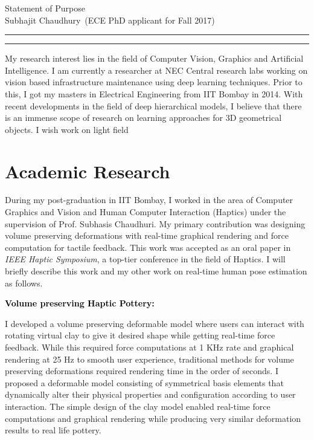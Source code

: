 \documentclass{article}
\newcommand{\soptitle}{Statement of Purpose}
\newcommand{\yourname}{Subhajit Chaudhury}
\newcommand{\statement}[1]{\par\medskip
	{\textcolor{black}{\textbf{#1:}}}\space
}
\begin{document}
	
	\begin{center}\LARGE\soptitle\\
	\large \yourname\ (ECE PhD applicant for Fall 2017)
	\end{center}
	
	\hrule
	\hrule height 1pt
	
	\bigskip
	
	My research interest lies in the field of Computer Vision, Graphics and Artificial Intelligence. I am currently a researcher at NEC Central research labs working on vision based infrastructure maintenance using deep learning techniques. Prior to this, I got my masters in Electrical Engineering from IIT Bombay in 2014. With recent developments in the field of deep hierarchical models, I believe that there is an immense scope of research on learning approaches for 3D geometrical objects. I  wish work on light field 
	
	\vspace*{-0.25cm}
	\section{Academic Research}
		\vspace*{-0.25cm}
	During my post-graduation in IIT Bombay, I worked in the area of Computer Graphics and Vision and Human Computer Interaction (Haptics) under the supervision of Prof. Subhasis Chaudhuri. My primary contribution was designing volume preserving deformations with real-time graphical rendering and force computation for tactile feedback. This work was accepted as an oral paper in\textit{ IEEE Haptic Symposium}, a top-tier conference in the field of Haptics. I will briefly describe this work and my other work on real-time human pose estimation as follows.
	
	\statement{Volume preserving Haptic Pottery}
	I developed a volume preserving deformable model where users can interact with rotating virtual clay to give it desired shape while getting real-time force feedback. While this required force computations at 1 KHz rate and graphical rendering at 25 Hz to smooth user experience, traditional methods for volume preserving deformations required rendering time in the order of seconds. I proposed a deformable model consisting of symmetrical basis elements that dynamically alter their physical properties and configuration according to user interaction. The simple design of the clay model enabled real-time force computations and graphical rendering while producing very similar deformation results to real life pottery.
	
\end{document}
